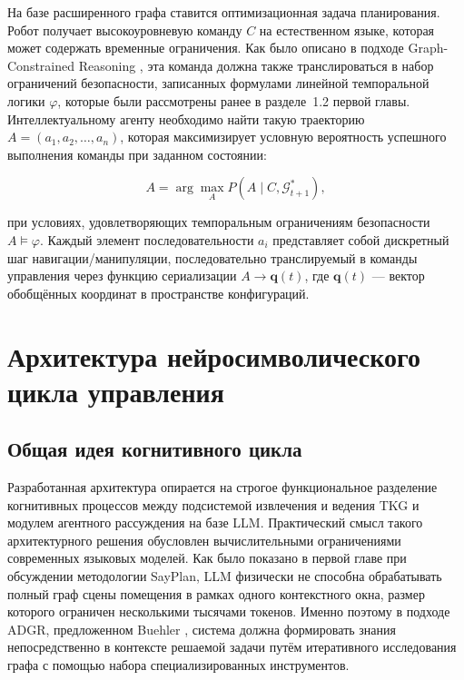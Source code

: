 На базе расширенного графа ставится оптимизационная задача планирования. Робот получает высокоуровневую команду $\displaystyle C$ на естественном языке, которая может содержать временные ограничения. Как было описано в подходе Graph-Constrained Reasoning \cite{ref29}, эта команда должна также транслироваться в набор ограничений безопасности, записанных формулами линейной темпоральной логики $\displaystyle \varphi$, которые были рассмотрены ранее в разделе~1.2 первой главы. Интеллектуальному агенту необходимо найти такую траекторию $\displaystyle A = (a_1, a_2, \ldots, a_n)$, которая максимизирует условную вероятность успешного выполнения команды при заданном состоянии:

\begin{equation}
    A = \arg\max_{A} P(A \mid C, \mathcal{G}_{t+1}^*),
    \label{eq:planning}
\end{equation}

при условиях, удовлетворяющих темпоральным ограничениям безопасности $\displaystyle A \models \varphi$. Каждый элемент последовательности $\displaystyle a_i$ представляет собой дискретный шаг навигации/манипуляции, последовательно транслируемый в команды управления через функцию сериализации $\displaystyle A \rightarrow \mathbf{q}(t)$, где $\displaystyle \mathbf{q}(t)$ — вектор обобщённых координат в пространстве конфигураций.


\section{Архитектура нейросимволического цикла управления}
\label{sec:architecture}

\subsection{Общая идея когнитивного цикла}

Разработанная архитектура опирается на строгое функциональное разделение когнитивных процессов между подсистемой извлечения и ведения TKG и модулем агентного рассуждения на базе LLM. Практический смысл такого архитектурного решения обусловлен вычислительными ограничениями современных языковых моделей. Как было показано в первой главе при обсуждении методологии SayPlan, LLM физически не способна обрабатывать полный граф сцены помещения в рамках одного контекстного окна, размер которого ограничен несколькими тысячами токенов. Именно поэтому в подходе ADGR, предложенном Buehler \cite{ref1}, система должна формировать знания непосредственно в контексте решаемой задачи путём итеративного исследования графа с помощью набора специализированных инструментов.

